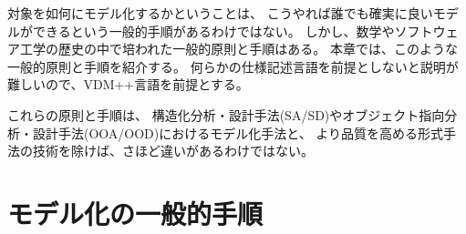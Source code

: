対象を如何にモデル化するかということは、
こうやれば誰でも確実に良いモデルができるという一般的手順があるわけではない。
しかし、数学やソフトウェア工学の歴史の中で培われた一般的原則と手順はある。
本章では、このような一般的原則と手順を紹介する。
何らかの仕様記述言語を前提としないと説明が難しいので、VDM++言語を前提とする。

これらの原則と手順は、
構造化分析・設計手法(SA/SD)やオブジェクト指向分析・設計手法(OOA/OOD)におけるモデル化手法と、
より品質を高める形式手法の技術を除けば、さほど違いがあるわけではない。

\section {モデル化の一般的手順}

